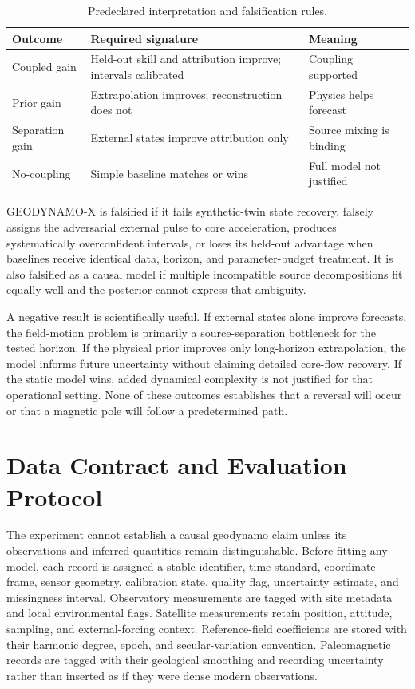 \documentclass[conference]{IEEEtran}
\begin{document}
\begin{table}[t]
\centering
\caption{Predeclared interpretation and falsification rules.}
\label{tab:rules}
\footnotesize
\begin{tabular}{P{1.55cm}P{2.35cm}P{2.25cm}}
\toprule
Outcome & Required signature & Meaning \\
\midrule
Coupled gain & Held-out skill and attribution improve; intervals calibrated & Coupling supported \\
Prior gain & Extrapolation improves; reconstruction does not & Physics helps forecast \\
Separation gain & External states improve attribution only & Source mixing is binding \\
No-coupling & Simple baseline matches or wins & Full model not justified \\
\bottomrule
\end{tabular}
\end{table}

GEODYNAMO-X is falsified if it fails synthetic-twin state recovery, falsely assigns the adversarial external pulse to core acceleration, produces systematically overconfident intervals, or loses its held-out advantage when baselines receive identical data, horizon, and parameter-budget treatment. It is also falsified as a causal model if multiple incompatible source decompositions fit equally well and the posterior cannot express that ambiguity.

A negative result is scientifically useful. If external states alone improve forecasts, the field-motion problem is primarily a source-separation bottleneck for the tested horizon. If the physical prior improves only long-horizon extrapolation, the model informs future uncertainty without claiming detailed core-flow recovery. If the static model wins, added dynamical complexity is not justified for that operational setting. None of these outcomes establishes that a reversal will occur or that a magnetic pole will follow a predetermined path.

\section{Data Contract and Evaluation Protocol}
The experiment cannot establish a causal geodynamo claim unless its observations and inferred quantities remain distinguishable. Before fitting any model, each record is assigned a stable identifier, time standard, coordinate frame, sensor geometry, calibration state, quality flag, uncertainty estimate, and missingness interval. Observatory measurements are tagged with site metadata and local environmental flags. Satellite measurements retain position, attitude, sampling, and external-forcing context. Reference-field coefficients are stored with their harmonic degree, epoch, and secular-variation convention. Paleomagnetic records are tagged with their geological smoothing and recording uncertainty rather than inserted as if they were dense modern observations.
\end{document}
